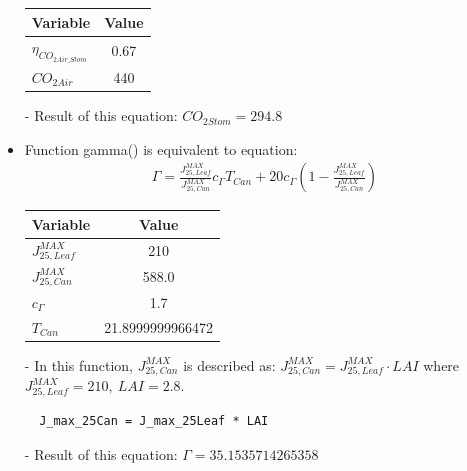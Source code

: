 \documentclass[a4paper]{article}
\numberwithin{equation}{section}
\begin{document}
\begin{itemize}
        \begin{table}[H]
          \centering
          \begin{tabular}{@{}lS@{}}
            \toprule
            \textbf{Variable}          & \textbf{Value} \\
            \midrule
            \(\eta_{CO_{2Air\_Stom}}\) & 0.67           \\
            \(CO_{2Air}\)              & 440            \\
            \bottomrule
          \end{tabular}
        \end{table}

  \item[-] Result of this equation: \( CO_{2Stom} = 294.8 \)

  \item Function gamma() is equivalent to equation:
        \begin{align*}
          \Gamma = \frac{J^{MAX}_{25,Leaf}}{J^{MAX}_{25,Can}}c_{\Gamma} T_{Can} + 20 c_{\Gamma} \left(1-\frac{J^{MAX}_{25,Leaf}}{J^{MAX}_{25,Can}}\right)
        \end{align*}

        \begin{table}[H]
          \centering
          \begin{tabular}{@{}lS[table-format=3.13]@{}}
            \toprule
            \textbf{Variable}     & \textbf{Value}   \\
            \midrule
            \(J^{MAX}_{25,Leaf}\) & 210              \\
            \(J^{MAX}_{25,Can}\)  & 588.0            \\
            \(c_{\Gamma}\)        & 1.7              \\
            \(T_{Can}\)           & 21.8999999966472 \\
            \bottomrule
          \end{tabular}
        \end{table}

  \item[-] In this function, \(J^{MAX}_{25,Can}\) is described as: \(J^{MAX}_{25,Can} = J^{MAX}_{25,Leaf} \cdot LAI\) where \(J^{MAX}_{25,Leaf} = 210,\ LAI = 2.8\).
        \begin{mdframed}[leftline=false,rightline=false,backgroundcolor=magenta!10,nobreak=true]
          \begin{verbatim}
  J_max_25Can = J_max_25Leaf * LAI
          \end{verbatim}
        \end{mdframed}
  \item[-] Result of this equation: \(\Gamma = 35.1535714265358\)


\end{itemize}
\end{document}
